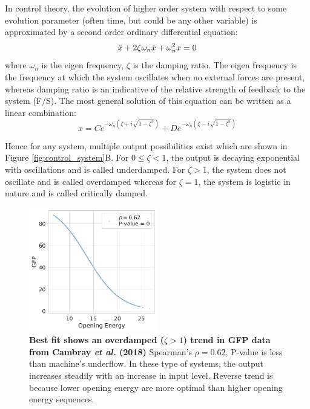 In control theory, the evolution of higher order system with respect to some evolution parameter (often time, but could be any other variable) is approximated by a second order ordinary differential equation: 
\begin{equation}
    \Ddot{x} + 2\zeta\omega_n\dot{x} + \omega_n^2 x = 0
\end{equation}
where $\omega_n$ is the eigen frequency, $\zeta$ is the damping ratio. The eigen frequency is the frequency at which the system oscillates when no external forces are present, whereas damping ratio is an indicative of the relative strength of feedback to the system (F/S). The most general solution of this equation can be written as a linear combination:
\begin{equation}
    x = Ce^{-\omega_n(\zeta + i\sqrt{1-\zeta^2})} + De^{-\omega_n(\zeta - i\sqrt{1-\zeta^2})}
\end{equation}

Hence for any system, multiple output possibilities exist which are shown in Figure \ref{fig:control_system}B. For $0 \leq \zeta < 1 $, the output is decaying exponential with oscillations and is called underdamped. For $\zeta > 1$, the system does not oscillate and is called overdamped whereas for $\zeta = 1$, the system is logistic in nature and is called critically damped. 



\begin{figure}
  \begin{center}
    \includegraphics[width=0.5\textwidth]{chapters/Discussion/Figures/cambray_fitting.pdf}
    \caption[Best fit shows an overdamped ($\zeta > 1$) trend in GFP data from Cambray \textit{et al.}]{\textbf{Best fit shows an overdamped ($\zeta > 1$) trend in GFP data from Cambray \textit{et al.} (2018)} Spearman's $\rho = 0.62$, P-value is less than machine's underflow. In these type of systems, the output increases steadily with an increase in input level. Reverse trend is because lower opening energy are more optimal than higher opening energy sequences. }%
    \label{fig:refitting_data_cambray}
  \end{center}
\end{figure}

